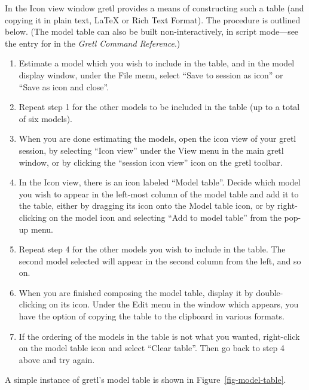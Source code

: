 In the Icon view window gretl provides a means of constructing such a
table (and copying it in plain text, {\LaTeX} or Rich Text Format).
The procedure is outlined below.  (The model table can also be built
non-interactively, in script mode---see the entry for 
in the \emph{Gretl Command Reference}.) 
      
\begin{enumerate}
\item Estimate a model which you wish to include in the table, and in
  the model display window, under the File menu, select ``Save to
  session as icon'' or ``Save as icon and close''.
\item Repeat step 1 for the other models to be included in the table
  (up to a total of six models).
\item When you are done estimating the models, open the icon view of
  your gretl session, by selecting ``Icon view'' under the View
  menu in the main gretl window, or by clicking the ``session icon
  view'' icon on the gretl toolbar.
\item In the Icon view, there is an icon labeled ``Model table''.
  Decide which model you wish to appear in the left-most column of the
  model table and add it to the table, either by dragging its icon
  onto the Model table icon, or by right-clicking on the model icon
  and selecting ``Add to model table'' from the pop-up menu.
\item Repeat step 4 for the other models you wish to include in the
  table.  The second model selected will appear in the second column
  from the left, and so on.
\item When you are finished composing the model table, display it by
  double-clicking on its icon.  Under the Edit menu in the window
  which appears, you have the option of copying the table to the
  clipboard in various formats.
\item If the ordering of the models in the table is not what you
  wanted, right-click on the model table icon and select ``Clear
  table''.  Then go back to step 4 above and try again.
\end{enumerate}

A simple instance of gretl's model table is shown in
Figure~\ref{fig-model-table}.

